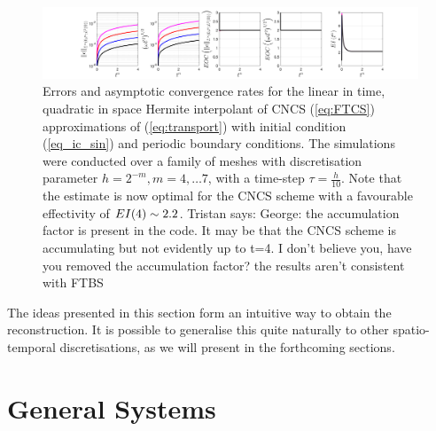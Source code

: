 \documentclass[final]{amsart}
\newcommand{\tristan}[1]{{\color{purple} Tristan says:  #1 }}
\numberwithin{equation}{section}
\begin{document}
\begin{figure}[H] 
	\includegraphics[width=\textwidth]{../figures/fig_CNCS_plots_1x5_sin_IC_ind_uniform_P2}	
	\caption{
		\label{fig:FTCS_prelim_P2}
		Errors and asymptotic convergence rates for the linear
                in time, quadratic in space Hermite interpolant of
                CNCS (\ref{eq:FTCS}) approximations of
                (\ref{eq:transport}) with initial condition
                (\ref{eq_ic_sin}) and periodic boundary
                conditions. The simulations were conducted over a
                family of meshes with discretisation parameter $h =
                2^{-m}, m = 4,\dots 7$, with a time-step $\tau =
                \tfrac{h}{10}$. Note that the estimate is now optimal
                for the CNCS scheme with a favourable effectivity of
                $EI \!\left({4}\right) \sim 2.2$. \tristan{George: the accumulation factor is present in the code.  It may be that the CNCS scheme is accumulating but not evidently up to t=4. I don't believe you,
                  have you removed the accumulation factor? the
                  results aren't consistent with FTBS}}
\end{figure}

The ideas presented in this section form an intuitive way to obtain
the reconstruction. It is possible to generalise this quite naturally
to other spatio-temporal discretisations, as we will present in the
forthcoming sections.

\section{General Systems}\label{sec:numerical_discretisation}

\end{document}
